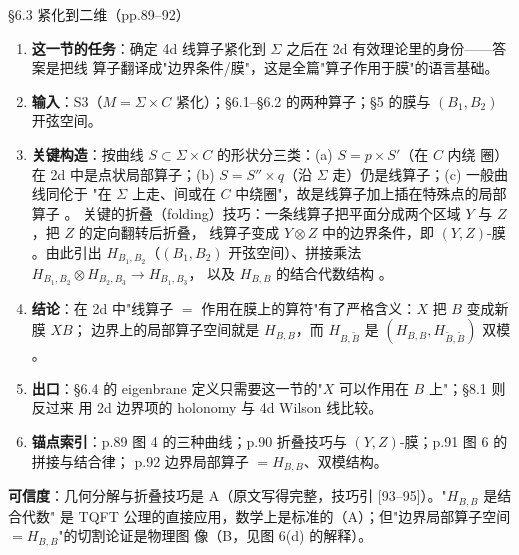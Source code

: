 \begin{kcard}{\S6.3 紧化到二维（pp.89--92）}
\begin{enumerate}[label=\textbf{\arabic*}]
\item \textbf{这一节的任务}：确定 4d 线算子紧化到 $\Sigma$ 之后在 2d 有效理论里的身份——答案是把线
  算子翻译成"边界条件/膜"，这是全篇"算子作用于膜"的语言基础。
\item \textbf{输入}：S3（$M=\Sigma\times C$ 紧化）；\S6.1--\S6.2 的两种算子；\S5 的膜与 $(B_1,B_2)$
  开弦空间。
\item \textbf{关键构造}：按曲线 $S\subset\Sigma\times C$ 的形状分三类：(a) $S=p\times S'$（在 $C$ 内绕
  圈）在 2d 中是点状局部算子；(b) $S=S''\times q$（沿 $\Sigma$ 走）仍是线算子；(c) 一般曲线同伦于
  "在 $\Sigma$ 上走、间或在 $C$ 中绕圈"，故是线算子加上插在特殊点的局部算子 \pA{}。
  关键的折叠（folding）技巧：一条线算子把平面分成两个区域 $Y$ 与 $Z$，把 $Z$ 的定向翻转后折叠，
  线算子变成 $Y\otimes Z$ 中的边界条件，即 $(Y,Z)$-膜 \pA{}。由此引出
  $H_{B_1,B_2}$（$(B_1,B_2)$ 开弦空间）、拼接乘法 $H_{B_1,B_2}\otimes H_{B_2,B_3}\to H_{B_1,B_3}$，
  以及 $H_{B,B}$ 的结合代数结构 \pA{}。
\item \textbf{结论}：在 2d 中"线算子 $=$ 作用在膜上的算符"有了严格含义：$X$ 把 $B$ 变成新膜 $XB$；
  边界上的局部算子空间就是 $H_{B,B}$，而 $H_{B,\tilde B}$ 是 $(H_{B,B},H_{\tilde B,\tilde B})$ 双模
  \pA{}。
\item \textbf{出口}：\S6.4 的 eigenbrane 定义只需要这一节的"$X$ 可以作用在 $B$ 上"；\S8.1 则反过来
  用 2d 边界项的 holonomy 与 4d Wilson 线比较。
\item \textbf{锚点索引}：p.89 图 4 的三种曲线；p.90 折叠技巧与 $(Y,Z)$-膜；p.91 图 6 的拼接与结合律；
  p.92 边界局部算子 $=H_{B,B}$、双模结构。
\end{enumerate}
\textbf{可信度}：几何分解与折叠技巧是 A（原文写得完整，技巧引 [93--95]）。"$H_{B,B}$ 是结合代数"
是 TQFT 公理的直接应用，数学上是标准的（A）；但"边界局部算子空间 $=H_{B,B}$"的切割论证是物理图
像（B，见图 6(d) 的解释）\pB{}。
\end{kcard}

